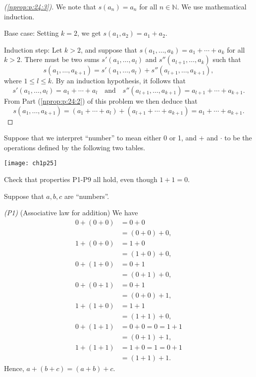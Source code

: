 \begin{proof}[(\ref{nprop:p:24:3})]
	We note that $s(a_n) = a_n$ for all $n \in \mathbb{N}$. We use mathematical induction.

	Base case: Setting $k = 2$, we get $s(a_1, a_2) = a_1 + a_2$.

	Induction step: Let $k > 2$, and suppose that $s(a_1, \ldots, a_k) = a_1 + \cdots + a_k$ for all $k > 2$. There must be two sums $s'(a_1, \ldots, a_l)$ and $s''(a_{l + 1}, \ldots, a_k)$ such that
	$$
		s(a_1, \ldots, a_{k + 1}) = s'(a_1, \ldots, a_l) + s''(a_{l + 1}, \ldots, a_{k + 1}),
	$$
	where $1 \leq l \leq k$. By an induction hypothesis, it follows that
	$$
		s'(a_1, \ldots, a_l) = a_1 + \cdots + a_l \quad \text{and} \quad s''(a_{l + 1}, \ldots, a_{k + 1}) = a_{l + 1} + \cdots + a_{k + 1}.
	$$
	From Part (\ref{nprop:p:24:2}) of this problem we then deduce that
	$$
		s(a_1, \ldots, a_{k + 1}) = (a_1 + \cdots + a_l) + (a_{l + 1} + \cdots + a_{k + 1}) = a_1 + \cdots + a_{k + 1}.
	$$
\end{proof}


\Newpage
\begin{problem} %
	Suppose that we interpret ``number'' to mean either 0 or 1, and $+$ and $\cdot$ to be the operations defined by the following two tables.

	\begin{center}
		\texttt{[image: ch1p25]}
	\end{center}
	Check that properties P1-P9 all hold, even though $1 + 1 = 0$.
\end{problem}

Suppose that $a, b, c$ are ``numbers''.

\bigskip \emph{(P1)} (Associative law for addition) \enspace We have
\begin{align*}
	0 + (0 + 0) & = 0 + 0             \\
	            & = (0 + 0) + 0,      \\
	1 + (0 + 0) & = 1 + 0             \\
	            & = (1 + 0) + 0,      \\
	0 + (1 + 0) & = 0 + 1             \\
	            & = (0 + 1) + 0,      \\
	0 + (0 + 1) & = 0 + 1             \\
	            & = (0 + 0) + 1,      \\
	1 + (1 + 0) & = 1 + 1             \\
	            & = (1 + 1) + 0,      \\
	0 + (1 + 1) & = 0 + 0 = 0 = 1 + 1 \\
	            & = (0 + 1) + 1,      \\
	1 + (1 + 1) & = 1 + 0 = 1 = 0 + 1 \\
	            & = (1 + 1) + 1.
\end{align*}
Hence, $a + (b + c) = (a + b) + c$.

